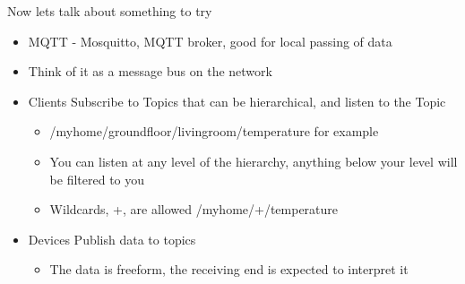 \begin{frame}
	{Now lets talk about something to try}

	\begin{itemize}
		\item MQTT - Mosquitto, MQTT broker, good for local passing of data
		\item Think of it as a message bus on the network
		\item Clients Subscribe to Topics that can be hierarchical, and listen to the Topic
		\begin{itemize}
			\item /myhome/groundfloor/livingroom/temperature for example
			\item You can listen at any level of the hierarchy, anything below your level will be filtered to you
			\item Wildcards, +, are allowed /myhome/+/temperature
		\end{itemize}
		\item Devices Publish data to topics
		\begin{itemize}
			\item The data is freeform, the receiving end is expected to interpret it
		\end{itemize}
	\end{itemize}

\end{frame}

\cprotect\note{
}

